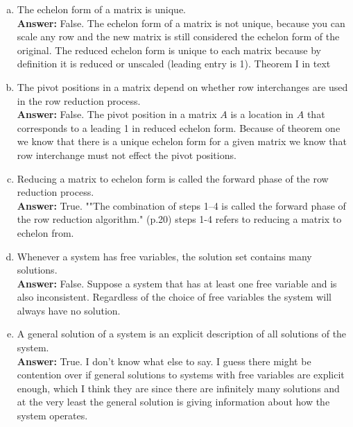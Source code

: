 \documentclass{amsart}
\begin{document}
\begin{enumerate}[(a)]
\item The echelon form of a matrix is unique.\\

\noindent \textbf{Answer: }
False. The echelon form of a matrix is not unique, because you can scale any row and the new matrix is still considered the echelon form of the original. The reduced echelon form is unique to each matrix because by definition it is reduced or unscaled (leading entry is 1). Theorem I in text
\vspace{1in}

\item The pivot positions in a matrix depend on whether row interchanges are used in the row reduction process. \\

\noindent \textbf{Answer: }
False. The pivot position in a matrix $A$ is a location in $A$ that corresponds to a leading 1 in reduced echelon form. Because of theorem one we know that there is a unique echelon form for a given matrix we know that row interchange must not effect the pivot positions. 
\vspace{1in}

\item Reducing a matrix to echelon form is called the forward phase of the row reduction process. \\

\noindent \textbf{Answer: }
True. ""The combination of steps 1–4 is called the forward phase of the row reduction algorithm." (p.20) steps 1-4 refers to reducing a matrix to echelon from.
\vspace{1in}

\item Whenever a system has free variables, the solution set contains many solutions. \\

\noindent \textbf{Answer: }
False. Suppose a system that has at least one free variable and is also inconsistent. Regardless of the choice of free variables the system will always have no solution.
\vspace{1in}


\item A general solution of a system is an explicit description of all solutions of the system. \\

\noindent \textbf{Answer: }
True. I don't know what else to say. I guess there might be contention over if general solutions to systems with free variables are explicit enough, which I think they are since there are infinitely many solutions and at the very least the general solution is giving information about how the system operates. 
\vspace{1in}




\end{enumerate}
\end{document}
